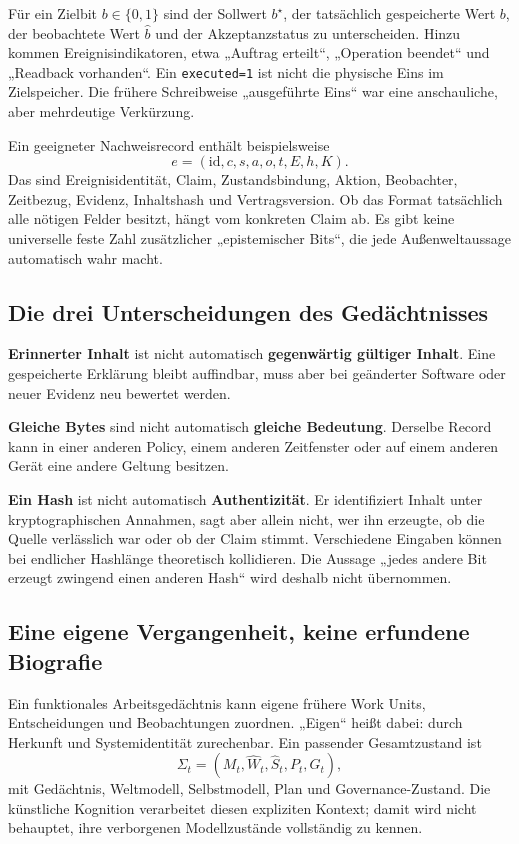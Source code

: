 \begin{cols}
Für ein Zielbit $b\in\{0,1\}$ sind der Sollwert $b^\star$, der tatsächlich gespeicherte Wert $b$, der beobachtete Wert $\hat b$ und der Akzeptanzstatus zu unterscheiden. Hinzu kommen Ereignisindikatoren, etwa „Auftrag erteilt“, „Operation beendet“ und „Readback vorhanden“. Ein \texttt{executed=1} ist nicht die physische Eins im Zielspeicher. Die frühere Schreibweise „ausgeführte Eins“ war eine anschauliche, aber mehrdeutige Verkürzung. 

Ein geeigneter Nachweisrecord enthält beispielsweise
\[
 e=(\mathrm{id},c,s,a,o,t,E,h,K).
\]
Das sind Ereignisidentität, Claim, Zustandsbindung, Aktion, Beobachter, Zeitbezug, Evidenz, Inhaltshash und Vertragsversion. Ob das Format tatsächlich alle nötigen Felder besitzt, hängt vom konkreten Claim ab. Es gibt keine universelle feste Zahl zusätzlicher „epistemischer Bits“, die jede Außenweltaussage automatisch wahr macht.

\subsection*{Die drei Unterscheidungen des Gedächtnisses}
\textbf{Erinnerter Inhalt} ist nicht automatisch \textbf{gegenwärtig gültiger Inhalt}. Eine gespeicherte Erklärung bleibt auffindbar, muss aber bei geänderter Software oder neuer Evidenz neu bewertet werden.

\textbf{Gleiche Bytes} sind nicht automatisch \textbf{gleiche Bedeutung}. Derselbe Record kann in einer anderen Policy, einem anderen Zeitfenster oder auf einem anderen Gerät eine andere Geltung besitzen.

\textbf{Ein Hash} ist nicht automatisch \textbf{Authentizität}. Er identifiziert Inhalt unter kryptographischen Annahmen, sagt aber allein nicht, wer ihn erzeugte, ob die Quelle verlässlich war oder ob der Claim stimmt. Verschiedene Eingaben können bei endlicher Hashlänge theoretisch kollidieren. Die Aussage „jedes andere Bit erzeugt zwingend einen anderen Hash“ wird deshalb nicht übernommen.

\subsection*{Eine eigene Vergangenheit, keine erfundene Biografie}
Ein funktionales Arbeitsgedächtnis kann eigene frühere Work Units, Entscheidungen und Beobachtungen zuordnen. „Eigen“ heißt dabei: durch Herkunft und Systemidentität zurechenbar. Ein passender Gesamtzustand ist
\[
 \Sigma_t=(M_t,\widehat W_t,\widehat S_t,P_t,G_t),
\]
mit Gedächtnis, Weltmodell, Selbstmodell, Plan und Governance-Zustand. Die künstliche Kognition verarbeitet diesen expliziten Kontext; damit wird nicht behauptet, ihre verborgenen Modellzustände vollständig zu kennen.


\end{cols}
